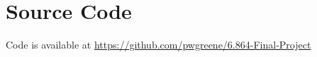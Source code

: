 \documentclass[12pt, journal]{IEEEtran}
\begin{document}
\section{Source Code}

Code is available at \url{https://github.com/pwgreene/6.864-Final-Project}



%
%


%
\end{document}
